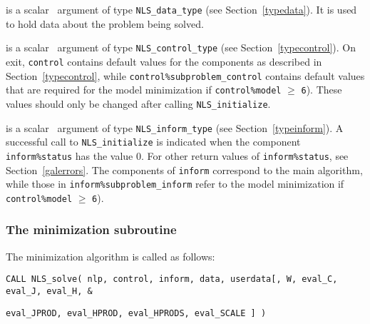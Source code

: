 \documentclass{galahad}
\newcommand{\packagename}{NLS}
\begin{document}
\vspace*{-3mm}
\begin{description}

 is a scalar \intentinout\ argument of type
{\tt \packagename\_data\_type}
(see Section~\ref{typedata}). It is used to hold data about the problem being
solved.

 is a scalar \intentout\ argument of type
{\tt \packagename\_control\_type}
(see Section~\ref{typecontrol}).
On exit, {\tt control} contains default values for the components as
described in Section~\ref{typecontrol}, while
{\tt control\%subproblem\_control} contains default values that are required for the
model minimization if {\tt control\%model} $\geq$ {\tt 6}).
These values should only be changed after calling
{\tt \packagename\_initialize}.

 is a scalar \intentout\ argument of type
{\tt \packagename\_inform\_type}
(see Section~\ref{typeinform}). A successful call to
{\tt \packagename\_initialize}
is indicated when the  component {\tt inform\%status} has the value 0.
For other return values of {\tt inform\%status}, see
Section~\ref{galerrors}.
The components of {\tt inform} correspond to the main algorithm, while
those in {\tt inform\%subproblem\_inform} refer to the model minimization
if {\tt control\%model} $\geq$ {\tt 6}).

\end{description}


\subsubsection{The minimization subroutine}
The minimization algorithm is called as follows:
\vspace*{1mm}

\hspace{8mm}
{\tt CALL \packagename\_solve( nlp, control, inform, data, userdata[, W,
   eval\_C, eval\_J, eval\_H, \hspace{3mm}                  \&}
\vspace*{-5mm}

\hspace{37mm}
{\tt eval\_JPROD,  eval\_HPROD, eval\_HPRODS, eval\_SCALE ] )}
\end{document}
